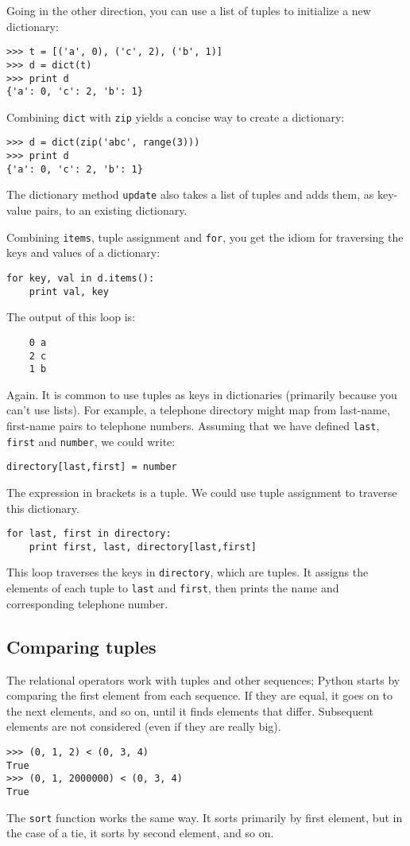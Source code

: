 \documentclass{article}
\begin{document}
Going in the other direction, you can use a list of tuples to
initialize a new dictionary:
\begin{verbatim}
>>> t = [('a', 0), ('c', 2), ('b', 1)]
>>> d = dict(t)
>>> print d
{'a': 0, 'c': 2, 'b': 1}
\end{verbatim}
Combining \verb|dict| with \verb|zip| yields a concise way to create a
dictionary:
\begin{verbatim}
>>> d = dict(zip('abc', range(3)))
>>> print d
{'a': 0, 'c': 2, 'b': 1}
\end{verbatim}
The dictionary method \verb|update| also takes a list of tuples and adds
them, as key-value pairs, to an existing dictionary.

Combining \verb|items|, tuple assignment and \verb|for|,
you get the idiom for traversing the keys and values of a dictionary:
\begin{verbatim}
for key, val in d.items():
    print val, key
\end{verbatim}
The output of this loop is:
\begin{verbatim}
    0 a
    2 c
    1 b
\end{verbatim}
Again.
It is common to use tuples as keys in dictionaries (primarily
because you can’t use lists). For example, a telephone directory
might map from last-name, first-name pairs to telephone numbers.
Assuming that we have defined \verb|last|, \verb|first| and
\verb|number|, we could write:
\begin{verbatim}
directory[last,first] = number
\end{verbatim}
The expression in brackets is a tuple. We could use tuple assignment
to traverse this dictionary.
\begin{verbatim}
for last, first in directory:
    print first, last, directory[last,first]
\end{verbatim}
This loop traverses the keys in \verb|directory|, which are tuples. It
assigns the elements of each tuple to \verb|last| and \verb|first|,
then prints the name and corresponding telephone number.
\subsection{Comparing tuples}
The relational operators work with tuples and other sequences; Python
starts by comparing the first element from each sequence. If they are
equal, it goes on to the next elements, and so on, until it finds
elements that differ. Subsequent elements are not considered (even if
they are really big).
\begin{verbatim}
>>> (0, 1, 2) < (0, 3, 4)
True
>>> (0, 1, 2000000) < (0, 3, 4)
True
\end{verbatim}
The \verb|sort| function works the same way. It sorts primarily by first
element, but in the case of a tie, it sorts by second element, and so
on.
\end{document}
